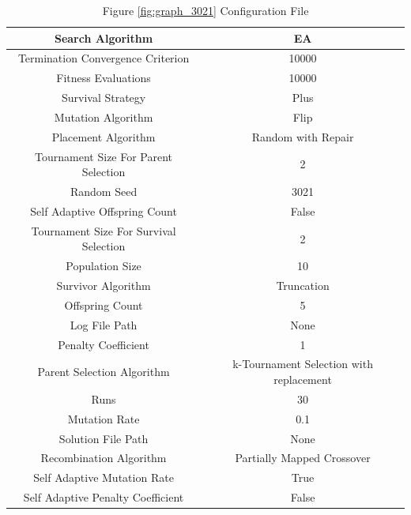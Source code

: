\documentclass{standalone}
\begin{document}
\clearpage
\begin{table}[!htb]
	\centering
	\caption{Figure \ref{fig:graph_3021} Configuration File}
	\label{tab:graph_3021}
	\begin{tabular}{| c | c |}
		\hline
		Search Algorithm		& EA		 \\
		\hline
		Termination Convergence Criterion		& 10000		 \\
		\hline
		Fitness Evaluations		& 10000		 \\
		\hline
		Survival Strategy		& Plus		 \\
		\hline
		Mutation Algorithm		& Flip		 \\
		\hline
		Placement Algorithm		& Random with Repair		 \\
		\hline
		Tournament Size For Parent Selection		& 2		 \\
		\hline
		Random Seed		& 3021		 \\
		\hline
		Self Adaptive Offspring Count		& False		 \\
		\hline
		Tournament Size For Survival Selection		& 2		 \\
		\hline
		Population Size		& 10		 \\
		\hline
		Survivor Algorithm		& Truncation		 \\
		\hline
		Offspring Count		& 5		 \\
		\hline
		Log File Path		& None		 \\
		\hline
		Penalty Coefficient		& 1		 \\
		\hline
		Parent Selection Algorithm		& k-Tournament Selection with replacement		 \\
		\hline
		Runs		& 30		 \\
		\hline
		Mutation Rate		& 0.1		 \\
		\hline
		Solution File Path		& None		 \\
		\hline
		Recombination Algorithm		& Partially Mapped Crossover		 \\
		\hline
		Self Adaptive Mutation Rate		& True		 \\
		\hline
		Self Adaptive Penalty Coefficient		& False		 \\
		\hline
	\end{tabular}
\end{table}
\end{document}
